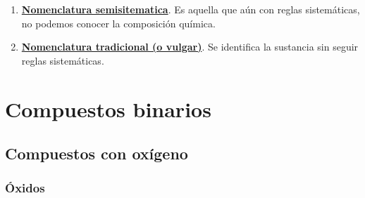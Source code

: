 \documentclass[12pt]{article}
\begin{document}
\begin{enumerate}
\begin{enumerate}
\begin{enumerate}[label=\itembolascolor{\arabic*}{blue}]

                        \item \textbf{Números de oxidación de los elementos} Se indican con  números romanos.
                        \item \textbf{Número de carga de los iones} Se indican con números arábicos.
                    \end{enumerate}
              \item \textbf{Sustitución}. Está basada en la nomenclatura de hidruros no metálicos, que se nombran como hidrocarburos y empleando los sufijos necesarios. La IUPAC acepta los nombres tradicionales como agua () y amoniaco ()
          \end{enumerate}
    \item \textbf{\uline{Nomenclatura semisitematica}}. Es aquella que aún con reglas sistemáticas, no podemos conocer la composición química.
    \item \textbf{\uline{Nomenclatura tradicional (o vulgar)}}. Se identifica la sustancia sin seguir reglas sistemáticas.
\end{enumerate}


\section{Compuestos binarios}\label{sec:binarios}

\subsection{Compuestos con oxígeno}\label{sec:compuestos_oxigeno}

\subsubsection{Óxidos}\label{sec:oxidos}
\end{document}
